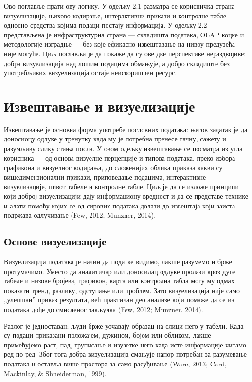 Ово поглавље прати ову логику. У одељку 2.1 разматра се корисничка страна — визуелизације, њихово кодирање, интерактивни прикази и контролне табле — односно средства којима подаци постају информација. У одељку 2.2 представљена је инфраструктурна страна — складишта података, OLAP коцке и методологије изградње — без које ефикасно извештавање на нивоу предузећа није могуће. Циљ поглавља је да покаже да су ове две перспективе нераздвојиве: добра визуелизација над лошим подацима обмањује, а добро складиште без употребљивих визуелизација остаје неискоришћен ресурс.

\section{Извештавање и визуелизације}
Извештавање је основна форма употребе пословних података: његов задатак је да доносиоцу одлуке у тренутку када му је потребна пренесе тачну, сажету и разумљиву слику стања посла. У овом одељку извештавање се посматра из угла корисника — од основа визуелне перцепције и типова података, преко избора графикона и визуелног кодирања, до сложенијих облика приказа какви су вишедимензионални прикази, приповедање подацима, интерактивне визуелизације, пивот табеле и контролне табле. Циљ је да се изложе принципи који доброј визуелизацији дају информациону вредност и да се представе технике и алати помоћу којих се од сирових података долази до извештаја који заиста подржава одлучивање (Few, 2012; Munzner, 2014).

\subsection{Основе визуелизације}
Визуелизација података је начин да податке видимо, лакше разумемо и брже протумачимо. Уместо да аналитичар или доносилац одлуке пролази кроз дуге табеле и низове бројева, графикон, карта или контролна табла могу му одмах показати тренд, разлику, одступање или проблем. Зато визуелизација није само „улепшан” приказ резултата, већ практичан део анализе који помаже да се из података дође до смисленог закључка (Few, 2012; Munzner, 2014).

Разлог је једноставан: људи брже уочавају образац на слици него у табели. Када су подаци приказани положајем, дужином, бојом или обликом, лакше примећујемо раст, пад, груписање и изузетке него када исте информације читамо ред по ред. Због тога добра визуелизација смањује напор потребан за разумевање података и оставља више простора за само расуђивање (Ware, 2013; Card, Mackinlay, \& Shneiderman, 1999).

